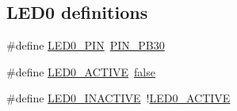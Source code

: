 \subsection*{L\+E\+D0 definitions}
\begin{DoxyCompactItemize}
\item 
\#define \mbox{\hyperlink{group__samd21__xplained__pro__features__group_ga3fc522fda449d6edde717d6a857429cf}{L\+E\+D0\+\_\+\+P\+IN}}~\mbox{\hyperlink{pio_2samd21j18a_8h_a5ff751a11f710f459e0ccb12b6db3e29}{P\+I\+N\+\_\+\+P\+B30}}
\item 
\#define \mbox{\hyperlink{group__samd21__xplained__pro__features__group_ga59e133b8ded0d632eeaeb2cbfec48886}{L\+E\+D0\+\_\+\+A\+C\+T\+I\+VE}}~\mbox{\hyperlink{group__group__sam0__utils_ga65e9886d74aaee76545e83dd09011727}{false}}
\item 
\#define \mbox{\hyperlink{group__samd21__xplained__pro__features__group_gaed3274cfe7ed308899e8416219bb08d2}{L\+E\+D0\+\_\+\+I\+N\+A\+C\+T\+I\+VE}}~!\mbox{\hyperlink{group__samd21__xplained__pro__features__group_ga59e133b8ded0d632eeaeb2cbfec48886}{L\+E\+D0\+\_\+\+A\+C\+T\+I\+VE}}
\end{DoxyCompactItemize}

